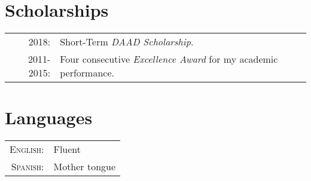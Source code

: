 \documentclass[a4paper,10pt]{article} %
\begin{document}

\section{Scholarships}

\begin{tabular}{rl}

\textsc{2018}: & Short-Term \emph{DAAD Scholarship}. \\

\textsc{2011-2015}: & Four consecutive \emph{Excellence Award} for my academic performance. \\

\end{tabular}


\section{Languages}

\begin{tabular}{rl}
\textsc{English:} & Fluent\\

\textsc{Spanish:} & Mother tongue\\

\end{tabular}

\end{document}
